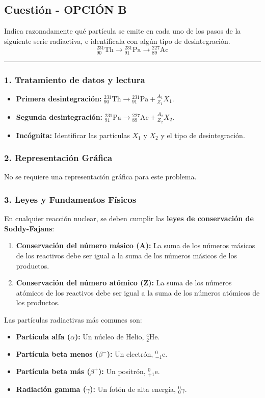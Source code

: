 \subsection{Cuestión - OPCIÓN B}
\label{subsec:B6B_2017_jun_ord}
\begin{cajaenunciado}
Indica razonadamente qué partícula se emite en cada uno de los pasos de la siguiente serie radiactiva, e identifícala con algún tipo de desintegración.
$$ {}_{90}^{231}\text{Th} \to {}_{91}^{231}\text{Pa} \to {}_{89}^{227}\text{Ac} $$
\end{cajaenunciado}
\hrule

\subsubsection*{1. Tratamiento de datos y lectura}
\begin{itemize}
    \item \textbf{Primera desintegración:} ${}_{90}^{231}\text{Th} \to {}_{91}^{231}\text{Pa} + {}_{Z_1}^{A_1}X_1$.
    \item \textbf{Segunda desintegración:} ${}_{91}^{231}\text{Pa} \to {}_{89}^{227}\text{Ac} + {}_{Z_2}^{A_2}X_2$.
    \item \textbf{Incógnita:} Identificar las partículas $X_1$ y $X_2$ y el tipo de desintegración.
\end{itemize}

\subsubsection*{2. Representación Gráfica}
No se requiere una representación gráfica para este problema.

\subsubsection*{3. Leyes y Fundamentos Físicos}
En cualquier reacción nuclear, se deben cumplir las \textbf{leyes de conservación de Soddy-Fajans}:
\begin{enumerate}
    \item \textbf{Conservación del número másico (A):} La suma de los números másicos de los reactivos debe ser igual a la suma de los números másicos de los productos.
    \item \textbf{Conservación del número atómico (Z):} La suma de los números atómicos de los reactivos debe ser igual a la suma de los números atómicos de los productos.
\end{enumerate}
Las partículas radiactivas más comunes son:
\begin{itemize}
    \item \textbf{Partícula alfa ($\alpha$):} Un núcleo de Helio, ${}_{2}^{4}\text{He}$.
    \item \textbf{Partícula beta menos ($\beta^-$):} Un electrón, ${}_{-1}^{0}\text{e}$.
    \item \textbf{Partícula beta más ($\beta^+$):} Un positrón, ${}_{+1}^{0}\text{e}$.
    \item \textbf{Radiación gamma ($\gamma$):} Un fotón de alta energía, ${}_{0}^{0}\gamma$.
\end{itemize}

